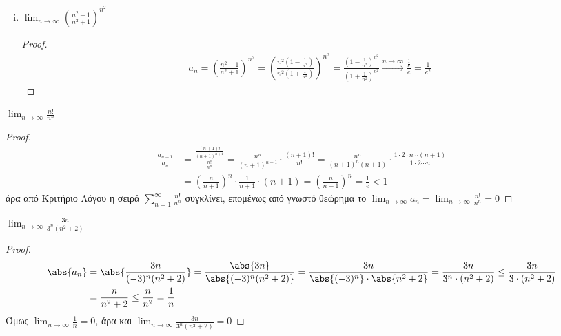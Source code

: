 \begin{enumerate}[i)]
        \item $ \lim_{n \to \infty} \left(\frac{n^{2}-1}{n^{2}+1} \right)^{n^{2}} $
          \begin{proof}
            \begin{align*}
              a_{n} = \left(\frac{n^{2}-1}{n^{2}+1}\right)^{n^{2}} = 
              \left(\frac{n^{2}\left(1- 
                    \frac{1}{n^{2}}\right)}{n^{2}\left(1+ 
              \frac{1}{n^{2}}\right)}\right)^{n^{2}} = 
              \frac{\left(1 - \frac{1}{n^{2}}\right)^{n^{2}}}
              {\left(1 + \frac{1}{n^{2}} \right)^{n^{2}}} 
              \xrightarrow{n \to \infty}  
              \frac{\frac{1}{e}}{e} = \frac{1}{e^{2}} 
            \end{align*} 
          \end{proof}
      \end{enumerate}

        \item $ \lim_{n \to \infty} \frac{n!}{n^{n}} $
          \begin{proof}
          \item {}
            \begin{align*}
              \frac{a_{n+1}}{a_{n}} 
                       &= \frac{\frac{(n+1)!}{(n+1)^{n+1}}}
                       {\frac{n!}{n^{n}}} = \frac{n^{n}}{(n+1)^{n+1}} \cdot 
                       \frac{(n+1)!}{n!} = \frac{n^{n}}{(n+1)^{n}(n+1)} \cdot 
                       \frac{1\cdot 2 \cdot n \cdots (n+1)}{1 \cdot 2 \cdots n} \\
                       &= \left(\frac{n}{n+1} \right)^{n} \cdot \frac{1}{n+1} 
                       \cdot (n+1) = (\frac{n}{n+1} )^{n} = \frac{1}{e} < 1
            \end{align*} 
            άρα από Κριτήριο Λόγου η σειρά $ \sum_{n=1}^{\infty} 
            \frac{n!}{n^{n}}  $ συγκλίνει, επομένως από γνωστό θεώρημα το $ 
            \lim_{n \to \infty} a_{n} = \lim_{n \to \infty} \frac{n!}{n^{n}} 
            = 0$ 
          \end{proof}

        \item $ \lim_{n \to \infty} \frac{3n}{3^{n}(n^{2}+2)} $ 
          \begin{proof}
            \begin{align*}
              \abs{a_{n}} 
               &= \abs{\frac{3n}{(-3)^{n}(n^{2}+2)}} =
               \frac{\abs{3n}}{\abs{(-3)^{n}(n^{2}+2)}} = \frac{3n}{\abs{(-3)^{n}} \cdot
               \abs{n^{2}+2} } = \frac{3n}{3^{n}\cdot (n^{2}+2)} \leq 
               \frac{3n}{3\cdot (n^{2}+2)} \\ 
               &= \frac{n}{n^{2}+2} \leq \frac{n}{n^{2}} = \frac{1}{n} 
            \end{align*} 
            Όμως $ \lim_{n \to \infty} \frac{1}{n} = 0 $, άρα και 
            $ \lim_{n \to \infty} \frac{3n}{3^{n}(n^{2}+2)} = 0 $
          \end{proof}

